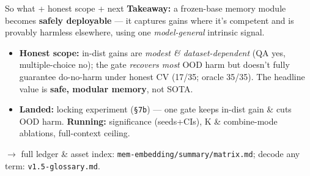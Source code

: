 \begin{frame}{So what + honest scope + next}
  \textbf{Takeaway:} a frozen-base memory module becomes \textbf{safely deployable} --- it captures gains where it's competent and is provably harmless elsewhere, using one \emph{model-general} intrinsic signal.
  \vspace{0.6em}
  \begin{itemize}\small
    \item \textbf{Honest scope:} in-dist gains are \emph{modest \& dataset-dependent} (QA yes, multiple-choice no); the gate \emph{recovers most} OOD harm but doesn't fully guarantee do-no-harm under honest CV (17/35; oracle 35/35). The headline value is \textbf{safe, modular memory}, not SOTA.
    \item \textbf{Landed:} locking experiment (\texttt{\S7b}) --- one gate keeps in-dist gain \& cuts OOD harm. \textbf{Running:} significance (seeds+CIs), K \& combine-mode ablations, full-context ceiling.
  \end{itemize}
  \vspace{0.5em}
  \footnotesize $\rightarrow$ full ledger \& asset index: \texttt{mem-embedding/summary/matrix.md}; decode any term: \texttt{v1.5-glossary.md}.
\end{frame}
